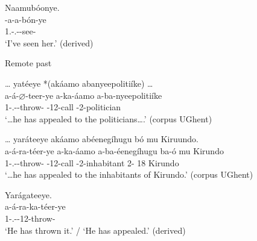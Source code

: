 \documentclass[output=paper]{langscibook}
\begin{document}
\ex
\begin{xlist}
\exi{\DJ{}}
Naamubóonye.\\
\gll
\N{}-a-a-bón-ye\\
1\SG.\SM-\N.\PST-\OM{}-see-\PFV{}\\
\glt
‘I’ve seen her.’ (derived)\\

\end{xlist}

\z

\ex
Remote past \citep[79,~80,~and~derived]{Nshemezimana2016}\\
\ea
\begin{xlist}
\exi{\CJ{}}
… yatéeye *(akáamo abanyeepolitiíke) …\\
\gll
a-á-$\varnothing$-teer-ye  a-ka-áamo  a-ba-nyeepolitiíke\\
1\SM-\RMT.\PST-\CJ{}-throw-\PFV{}  \AUG{}-12-call  \AUG{}-2-politician\\
\glt
‘…he has appealed to the politicians….’ (corpus UGhent)\\

\end{xlist}

\ex
\begin{xlist}
\exi{\DJ{}}
… yaráteeye akáamo abéenegíhugu bó mu Kiruundo.\\
\gll
a-á-ra-téer-ye  a-ka-áamo  a-ba-éenegíhugu  ba-ó mu  Kirundo \\
1\SM-\RMT.\PST-\DJ{}-throw-\PFV{}  \AUG{}-12-call  \AUG{}-2-inhabitant  2-\CONN{} 18  Kirundo \\
\glt
‘…he has appealed to the inhabitants of Kirundo.’ (corpus UGhent)\\

\end{xlist}

\ex
\begin{xlist}
\exi{\DJ{}}
Yarágateeye.\\
\gll
a-á-ra-ka-téer-ye\\
1\SM-\RMT.\PST-\DJ{}-12\OM{}-throw-\PFV{}\\
\glt
‘He has thrown it.’ / ‘He has appealed.’ (derived)\\

\end{xlist}
\end{document}
